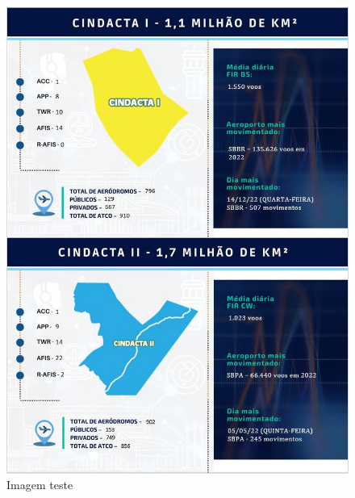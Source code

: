 \documentclass[
]{book}
\begin{document}
\begin{figure}
\centering
\includegraphics{imagens/fig3.jpg}
\caption{Imagem teste}
\end{figure}
\end{document}
